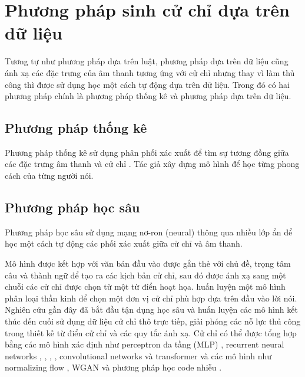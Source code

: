 \section{Phương pháp sinh cử chỉ dựa trên dữ liệu}

Tương tự như phương pháp dựa trên luật, phương pháp dựa trên dữ liệu cũng ánh xạ các đặc trưng của âm thanh tương ứng với cử chỉ nhưng thay vì làm thủ công thì được sử dụng học một cách tự động dựa trên dữ liệu.
Trong đó có hai phương pháp chính là phương pháp thống kê và phương pháp dựa trên dữ liệu.


\subsection{Phương pháp thống kê}

Phương pháp thống kê sử dụng phân phối xác xuất để tìm sự tương đồng giữa các đặc trưng âm thanh và cử chỉ \cite{levine2010gesture}. Tác giả \cite{neff2008gesture} xây dựng mô hình để học từng phong cách của từng người nói.

\subsection{Phương pháp học sâu}

Phương pháp học sâu sử dụng mạng nơ-ron (neural) thông qua nhiều lớp ẩn để học một cách tự động các phối xác xuất giữa cử chỉ và âm thanh.

Mô hình được kết hợp với văn bản đầu vào được gắn thẻ với chủ đề, trọng tâm câu và thành ngữ để tạo ra các kịch bản cử chỉ, sau đó được ánh xạ sang một chuỗi các cử chỉ được chọn từ một từ điển hoạt họa. \cite{chiu2015predicting} huấn luyện một mô hình phân loại thần kinh để chọn một đơn vị cử chỉ phù hợp dựa trên đầu vào lời nói. Nghiên cứu gần đây đã bắt đầu tận dụng học sâu và huấn luyện các mô hình kết thúc đến cuối sử dụng dữ liệu cử chỉ thô trực tiếp, giải phóng các nỗ lực thủ công trong thiết kế từ điển cử chỉ và các quy tắc ánh xạ. Cử chỉ có thể được tổng hợp bằng các mô hình xác định như perceptron đa tầng (MLP) \cite{kucherenko2020gesticulator}, recurrent neural networks \cite{bhattacharya2021speech2affectivegestures}, \cite{liu2022learning}, \cite{hasegawa2018evaluation}, \cite{yoon2020speech}, convolutional networks \cite{habibie2021learning} và transformer \cite{bhattacharya2021text2gestures} và các mô hình như normalizing flow \cite{alexanderson2020style}, WGAN \cite{wu2021probabilistic} và phương pháp học code nhiễu \cite{xu2022freeform}.


